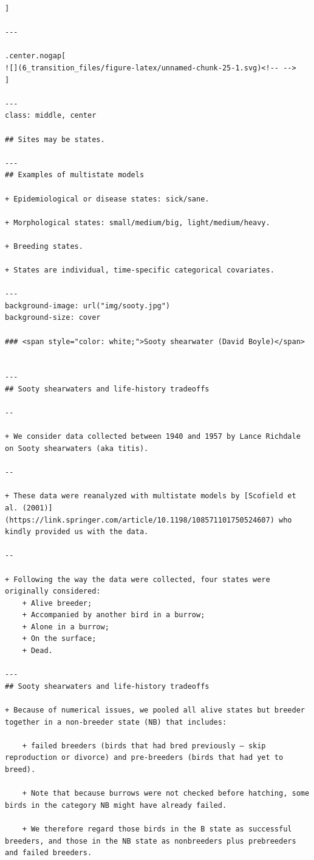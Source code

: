 \documentclass[
]{article}
\begin{document}
\begin{verbatim}
]

---

.center.nogap[
![](6_transition_files/figure-latex/unnamed-chunk-25-1.svg)<!-- --> 
]

---
class: middle, center

## Sites may be states.

---
## Examples of multistate models

+ Epidemiological or disease states: sick/sane.

+ Morphological states: small/medium/big, light/medium/heavy.

+ Breeding states.

+ States are individual, time-specific categorical covariates.

---
background-image: url("img/sooty.jpg")
background-size: cover

### <span style="color: white;">Sooty shearwater (David Boyle)</span>


---
## Sooty shearwaters and life-history tradeoffs

--

+ We consider data collected between 1940 and 1957 by Lance Richdale on Sooty shearwaters (aka titis). 

--

+ These data were reanalyzed with multistate models by [Scofield et al. (2001)](https://link.springer.com/article/10.1198/108571101750524607) who kindly provided us with the data. 

--

+ Following the way the data were collected, four states were originally considered:
    + Alive breeder;
    + Accompanied by another bird in a burrow;
    + Alone in a burrow;
    + On the surface;
    + Dead.
    
---
## Sooty shearwaters and life-history tradeoffs

+ Because of numerical issues, we pooled all alive states but breeder together in a non-breeder state (NB) that includes:

    + failed breeders (birds that had bred previously – skip reproduction or divorce) and pre-breeders (birds that had yet to breed). 
    
    + Note that because burrows were not checked before hatching, some birds in the category NB might have already failed. 
    
    + We therefore regard those birds in the B state as successful breeders, and those in the NB state as nonbreeders plus prebreeders and failed breeders.


\end{verbatim}
\end{document}
